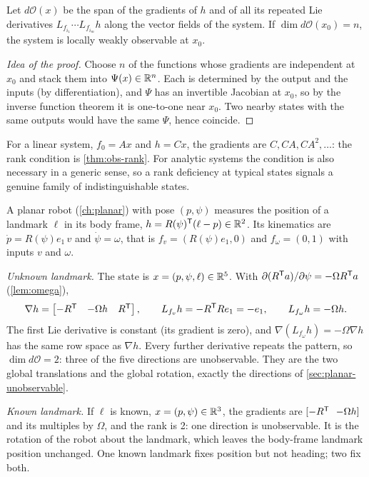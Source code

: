 \begin{theorem}
\label{thm:obs-rank-nonlinear}
Let $d\mathcal{O}(x)$ be the span of the gradients of $h$ and of all its repeated Lie derivatives $L_{f_{i_1}}\cdots L_{f_{i_m}}h$ along the vector fields of
the system. If $\dim d\mathcal{O}(x_0) = n$, the system is locally weakly observable at $x_0$.
\end{theorem}
\begin{proof}[Idea of the proof]
Choose $n$ of the functions whose gradients are independent at $x_0$ and stack them into $\Psi(x) \in \mathbb{R}^n$. Each is determined by the output
and the inputs (by differentiation), and $\Psi$ has an invertible Jacobian at $x_0$, so by the inverse function theorem it is one-to-one near $x_0$.
Two nearby states with the same outputs would have the same $\Psi$, hence coincide.
\end{proof}

For a linear system, $f_0 = Ax$ and $h = Cx$, the gradients are $C, CA, CA^2, \dots$: the rank condition is \cref{thm:obs-rank}. For analytic systems the
condition is also necessary in a generic sense, so a rank deficiency at typical states signals a genuine family of indistinguishable states.

\begin{worked}
A planar robot (\cref{ch:planar}) with pose $(p, \psi)$ measures the position of a landmark $\ell$ in its body frame, $h = R(\psi)^{\mathsf{T}}(\ell - p) \in \mathbb{R}^2$. Its kinematics
are $\dot p = R(\psi)e_1\,v$ and $\dot\psi = \omega$, that is $f_v = (R(\psi)e_1, 0)$ and $f_\omega = (0, 1)$ with inputs $v$ and $\omega$.

\emph{Unknown landmark.} The state is $x = (p, \psi, \ell) \in \mathbb{R}^5$. With $\partial(R^{\mathsf{T}} a)/\partial\psi = -\Omega R^{\mathsf{T}} a$ (\cref{lem:omega}),
\begin{equation*}
  \nabla h = \begin{bmatrix} -R^{\mathsf{T}} & -\Omega h & R^{\mathsf{T}} \end{bmatrix}, \qquad
  L_{f_v}h = -R^{\mathsf{T}} Re_1 = -e_1, \qquad L_{f_\omega}h = -\Omega h .
\end{equation*}
The first Lie derivative is constant (its gradient is zero), and $\nabla(L_{f_\omega}h) = -\Omega\nabla h$ has the same row space as $\nabla h$. Every further
derivative repeats the pattern, so $\dim d\mathcal{O} = 2$: three of the five directions are unobservable. They are the two global translations and the
global rotation, exactly the directions of \cref{sec:planar-unobservable}.

\emph{Known landmark.} If $\ell$ is known, $x = (p, \psi) \in \mathbb{R}^3$, the gradients are $[-R^{\mathsf{T}}\ \ {-\Omega h}]$ and its multiples by $\Omega$, and the rank is 2: one
direction is unobservable. It is the rotation of the robot about the landmark, which leaves the body-frame landmark position unchanged. One known
landmark fixes position but not heading; two fix both.
\end{worked}

